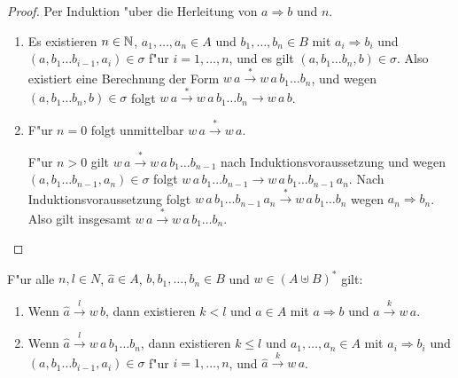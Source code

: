 \documentclass[12pt,a4paper]{article}
\begin{document}
\begin{proof}
  Per Induktion "uber die Herleitung von $a \Rightarrow b$ und $n$.
  \begin{enumerate}
  \item Es existieren $n \in \mathbb N$, $a_1,\ldots,a_n \in A$ und $b_1,\ldots,b_n \in B$ mit
    $a_i \Rightarrow b_i$ und $(a,b_1 \ldots b_{i-1},a_i) \in \sigma$ f"ur $i = 1,\ldots,n$,
    und es gilt $(a,b_1 \ldots b_n,b) \in \sigma$. Also existiert eine Berechnung der Form
    $w\,a \stackrel{*}{\to} w\,a\,b_1 \ldots b_n$, und wegen $(a,b_1 \ldots b_n,b) \in \sigma$
    folgt $w\,a \stackrel{*}{\to} w\,a\,b_1 \ldots b_n \to w\,a\,b$.

  \item F"ur $n = 0$ folgt unmittelbar $w\,a \stackrel{*}{\to} w\,a$.

    F"ur $n > 0$ gilt $w\,a \stackrel{*}{\to} w\,a\,b_1 \ldots b_{n-1}$ nach Induktionsvoraussetzung und wegen
    $(a,b_1 \ldots b_{n-1},a_n)\in\sigma$ folgt $w\,a\,b_1 \ldots b_{n-1} \to w\,a\,b_1 \ldots b_{n-1}\,a_n$.
    Nach Induktionsvoraussetzung folgt
    $w\,a\,b_1 \ldots b_{n-1}\,a_n \stackrel{*}{\to} w\,a\,b_1 \ldots b_n$ wegen $a_n \Rightarrow b_n$.
    Also gilt insgesamt $w\,a \stackrel{*}{\to} w\,a\,b_1 \ldots b_n$.
  \end{enumerate}
\end{proof}

\begin{theorem}[Korrektheit] \label{theorem:Korrektheit}
  F"ur alle $n,l \in N$, $\hat{a} \in A$, $b, b_1,\ldots,b_n \in B$ und
  $w \in (A \uplus B)^*$ gilt:
  \begin{enumerate}
  \item Wenn $\hat{a} \stackrel{l}{\to} w\,b$, dann existieren $k < l$ und $a \in A$ mit
    $a \Rightarrow b$ und $\hat{a} \stackrel{k}{\to} w\,a$.
  \item Wenn $\hat{a} \stackrel{l}{\to} w\,a\,b_1 \ldots b_n$, dann existieren $k \le l$
    und $a_1,\ldots,a_n \in A$ mit
    $a_i \Rightarrow b_i$ und $(a,b_1 \ldots b_{i-1},a_i) \in \sigma$ f"ur $i=1,\ldots,n$, und
    $\hat{a} \stackrel{k}{\to} w\,a$.
  \end{enumerate}
\end{theorem}
\end{document}
